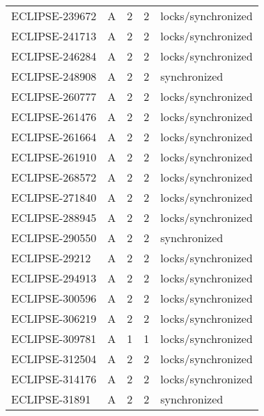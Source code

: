 \begin{table}[!htp]
{\begin{tabular}{lllll}
    ECLIPSE-239672 & A        & 2             & 2               & locks/synchronized                          \\
    ECLIPSE-241713 & A        & 2             & 2               & locks/synchronized                          \\
    ECLIPSE-246284 & A        & 2             & 2               & locks/synchronized                          \\
    ECLIPSE-248908 & A        & 2             & 2               & synchronized                                \\
    ECLIPSE-260777 & A        & 2             & 2               & locks/synchronized                          \\
    ECLIPSE-261476 & A        & 2             & 2               & locks/synchronized                          \\
    ECLIPSE-261664 & A        & 2             & 2               & locks/synchronized                          \\
    ECLIPSE-261910 & A        & 2             & 2               & locks/synchronized                          \\
    ECLIPSE-268572 & A        & 2             & 2               & locks/synchronized                          \\
    ECLIPSE-271840 & A        & 2             & 2               & locks/synchronized                          \\
    ECLIPSE-288945 & A        & 2             & 2               & locks/synchronized                          \\
    ECLIPSE-290550 & A        & 2             & 2               & synchronized                                \\
    ECLIPSE-29212  & A        & 2             & 2               & locks/synchronized                          \\
    ECLIPSE-294913 & A        & 2             & 2               & locks/synchronized                          \\
    ECLIPSE-300596 & A        & 2             & 2               & locks/synchronized                          \\
    ECLIPSE-306219 & A        & 2             & 2               & locks/synchronized                          \\
    ECLIPSE-309781 & A        & 1             & 1               & locks/synchronized                          \\
    ECLIPSE-312504 & A        & 2             & 2               & locks/synchronized                          \\
    ECLIPSE-314176 & A        & 2             & 2               & locks/synchronized                          \\
    ECLIPSE-31891  & A        & 2             & 2               & synchronized                                \\
	\bottomrule
	\end{tabular}
	}
\end{table}

